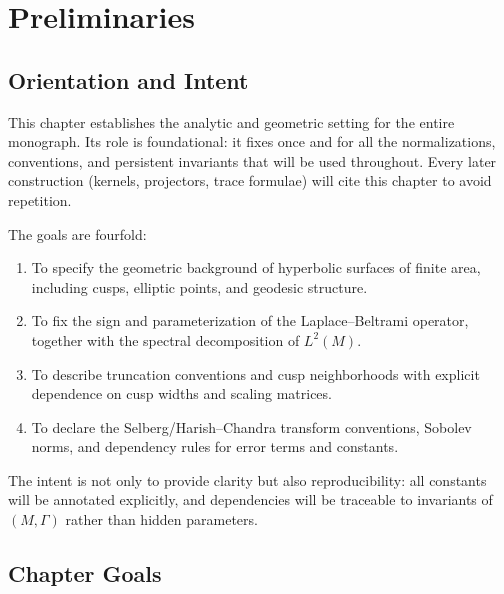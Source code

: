
\chapter{Preliminaries}

\section*{Orientation and Intent}

This chapter establishes the analytic and geometric setting for the entire
monograph. Its role is foundational: it fixes once and for all the
normalizations, conventions, and persistent invariants that will be used
throughout. Every later construction (kernels, projectors, trace formulae)
will cite this chapter to avoid repetition.

The goals are fourfold:
\begin{enumerate}
  \item To specify the geometric background of hyperbolic surfaces of finite area,
        including cusps, elliptic points, and geodesic structure.
  \item To fix the sign and parameterization of the Laplace--Beltrami operator,
        together with the spectral decomposition of $L^{2}(M)$.
  \item To describe truncation conventions and cusp neighborhoods with explicit
        dependence on cusp widths and scaling matrices.
  \item To declare the Selberg/Harish–Chandra transform conventions,
        Sobolev norms, and dependency rules for error terms and constants.
\end{enumerate}

The intent is not only to provide clarity but also reproducibility:
all constants will be annotated explicitly, and dependencies will be
traceable to invariants of $(M,\Gamma)$ rather than hidden parameters.

\section*{Chapter Goals}

